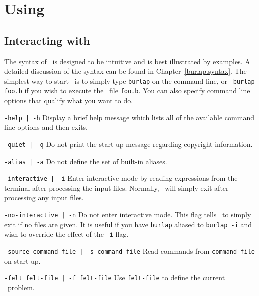 \section{Using \burlap}
\label{burlap.using}

\subsection{Interacting with \burlap}
\label{burlap.interacting}

The syntax of \burlap\ is designed to be intuitive and is best
illustrated by examples.  A detailed discussion of the syntax can be
found in Chapter~\ref{burlap.syntax}.  The simplest way to start
\burlap\ is to simply type {\tt burlap} on the command line, or {\tt
burlap foo.b} if you wish to execute the \burlap\ file {\tt foo.b}.
You can also specify command line options that qualify what you want
to do.

\begin{dispitems}
\item [\tt -help | -h]
	Display a brief help message which lists all of the available
	command line options and then exits.

\item [\tt -quiet | -q]
	Do not print the start-up message regarding copyright
	information.

\item [\tt -alias | -a]
	Do not define the set of built-in aliases.

\item [\tt -interactive | -i]
	Enter interactive mode by reading expressions from the
	terminal after processing the input files.  Normally, \burlap\
	will simply exit after processing any input files.

\item [\tt -no-interactive | -n]
	Do not enter interactive mode.  This flag tells \burlap\ to
	simply exit if no files are given.  It is useful if you have
	{\tt burlap} aliased to {\tt burlap -i} and wish to override
	the effect of the {\tt -i} flag.

\item [\tt -source command-file | -s command-file]
	Read commands from {\tt command-file} on start-up.

\item [\tt -felt felt-file | -f felt-file]
	Use {\tt felt-file} to define the current \felt\ problem.

\end{dispitems}

